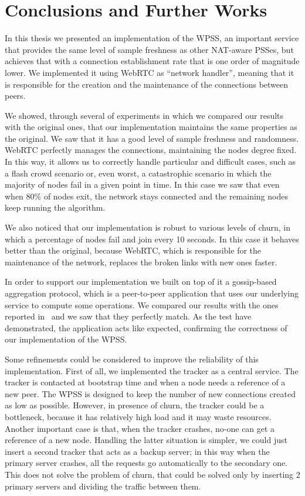 
\chapter{Conclusions and Further Works}
\label{cha:conclusions}
In this thesis we presented an implementation of the \ac{WPSS}, an important service that provides the same level of sample freshness as other NAT-aware PSSes, but achieves that with a connection establishment rate that is one order of magnitude lower. We implemented it using WebRTC as ``network handler'', meaning that it is responsible for the creation and the maintenance of the connections between peers.

We showed, through several of experiments in which we compared our results with the original ones, that our implementation maintains the same properties as the original. We saw that it has a good level of sample freshness and randomness. WebRTC perfectly manages the connections, maintaining the nodes degree fixed. In this way, it allows us to correctly handle particular and difficult cases, such as a flash crowd scenario or, even worst, a catastrophic scenario in which the majority of nodes fail in a given point in time. In this case we saw that even when 80\% of nodes exit, the network stays connected and the remaining nodes keep running the algorithm. 

We also noticed that our implementation is robust to various levels of churn, in which a percentage of nodes fail and join every 10 seconds. In this case it behaves better than the original, because WebRTC, which is responsible for the maintenance of the network, replaces  the broken links with new ones faster. 

In order to support our implementation we built on top of it a gossip-based aggregation protocol, which is a peer-to-peer application that uses our underlying service to compute some operations. We compared our results with the ones reported in~\cite{aggregation} and we saw that they perfectly match. As the test have demonstrated, the application acts like expected, confirming the correctness of our implementation of the \ac{WPSS}. 

Some refinements could be considered to improve the reliability of this implementation. First of all, we implemented the tracker as a central service. The tracker is contacted at bootstrap time and when a node needs a reference of a new peer. The \ac{WPSS} is designed to keep the number of new connections created as low as possible. However, in presence of churn, the tracker could be a bottleneck, because it has relatively high load and it may waste resources. Another important case is that, when the tracker crashes, no-one can get a reference of a new node. Handling the latter situation is simpler, we could just insert a second tracker that acts as a backup server; in this way when the primary server crashes, all the requests go automatically to the secondary one. This does not solve the problem of churn, that could be solved only by inserting 2 primary servers and dividing the traffic between them. 

